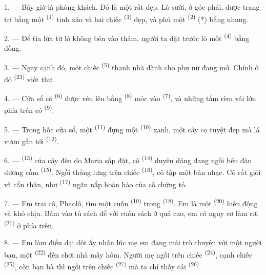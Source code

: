 1. --- Bây giờ là phòng khách. Đó là một  rất đẹp. Lò sưởi, ở góc
phải, được trang trí bằng một  \textsuperscript{(1)} tinh xảo và
hai chiếc  \textsuperscript{(3)} đẹp, và phủ một 
\textsuperscript{(2)} (*) bằng nhung.

2. --- Để tia lửa từ lò không bén vào thảm, người ta đặt trước lò một  \textsuperscript{(4)} bằng đồng.

3. --- Ngay cạnh đó, một chiếc  \textsuperscript{(5)} thanh nhã dành
cho phụ nữ đang mở. Chính ở đó  \textsuperscript{(23)} viết thư.

4. --- Cửa sổ có  \textsuperscript{(6)} được vén lên bằng
 \textsuperscript{(8)} móc vào 
\textsuperscript{(7)}, và những tấm rèm vải lớn phía trên có 
\textsuperscript{(9)}.

5. --- Trong hốc cửa sổ, một  \textsuperscript{(11)} đựng một
 \textsuperscript{(10)} xanh, một cây cọ tuyệt đẹp mà lá vươn gần tới
 \textsuperscript{(12)}.

6. ---  \textsuperscript{(13)} của cây đèn do Maria sắp đặt, cô
 \textsuperscript{(14)} duyên dáng đang ngồi bên đàn dương cầm
\textsuperscript{(15)}. Ngồi thẳng lưng trên chiếc 
\textsuperscript{(16)}, cô tập một bản nhạc. Cô rất giỏi và cẩn thận, như  \textsuperscript{(17)} ngăn nắp hoàn hảo của cô chứng tỏ.

\VUsaut{5.0mm}
\VUsaut{3.0mm}

7. --- Em trai cô, Phaolô, tìm một cuốn  \textsuperscript{(19)} trong
 \textsuperscript{(18)}. Em là một 
\textsuperscript{(20)} hiếu động và khó chịu. Bám vào tủ sách để với cuốn sách ở quá
cao, em có nguy cơ làm rơi  \textsuperscript{(21)} ở phía
trên.

8. --- Em làm điều dại dột ấy nhân lúc mẹ em đang mải trò chuyện với một người bạn, một
 \textsuperscript{(22)} đến chơi nhà mấy hôm. Người mẹ ngồi trên chiếc
 \textsuperscript{(24)}, cạnh chiếc 
\textsuperscript{(25)}, còn bạn bà thì ngồi trên chiếc 
\textsuperscript{(27)} mà ta chỉ thấy cái  \textsuperscript{(26)}.

